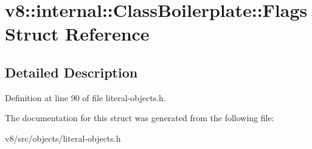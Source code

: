 \hypertarget{structv8_1_1internal_1_1ClassBoilerplate_1_1Flags}{}\section{v8\+:\+:internal\+:\+:Class\+Boilerplate\+:\+:Flags Struct Reference}
\label{structv8_1_1internal_1_1ClassBoilerplate_1_1Flags}


\subsection{Detailed Description}


Definition at line 90 of file literal-\/objects.\+h.



The documentation for this struct was generated from the following file\+:\begin{DoxyCompactItemize}
\item 
v8/src/objects/literal-\/objects.\+h\end{DoxyCompactItemize}

